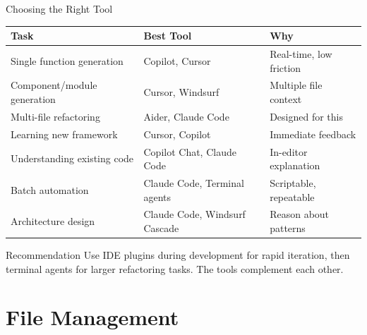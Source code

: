 \documentclass[aspectratio=169,11pt]{beamer}
\begin{document}
\begin{frame}{Choosing the Right Tool}
    \small
    \begin{tabular}{@{}lll@{}}
        \toprule
        \textbf{Task} & \textbf{Best Tool} & \textbf{Why} \\
        \midrule
        Single function generation & Copilot, Cursor & Real-time, low friction \\
        Component/module generation & Cursor, Windsurf & Multiple file context \\
        Multi-file refactoring & Aider, Claude Code & Designed for this \\
        Learning new framework & Cursor, Copilot & Immediate feedback \\
        Understanding existing code & Copilot Chat, Claude Code & In-editor explanation \\
        Batch automation & Claude Code, Terminal agents & Scriptable, repeatable \\
        Architecture design & Claude Code, Windsurf Cascade & Reason about patterns \\
        \bottomrule
    \end{tabular}

    \vspace{0.4cm}
    \begin{alertblock}{Recommendation}
        Use IDE plugins during development for rapid iteration, then terminal agents for larger refactoring tasks. The tools complement each other.
    \end{alertblock}

\end{frame}

\section{File Management}
\end{document}
